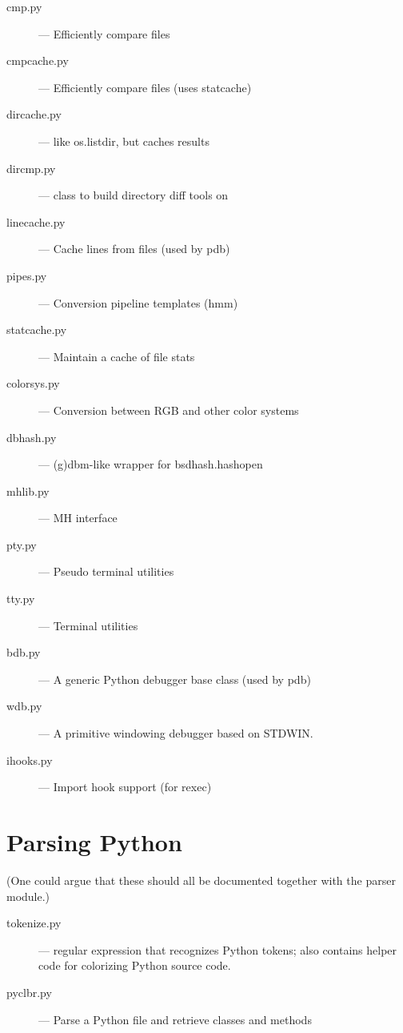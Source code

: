 \begin{description}
\item[cmp.py]
--- Efficiently compare files

\item[cmpcache.py]
--- Efficiently compare files (uses statcache)

\item[dircache.py]
--- like os.listdir, but caches results

\item[dircmp.py]
--- class to build directory diff tools on

\item[linecache.py]
--- Cache lines from files (used by pdb)

\item[pipes.py]
--- Conversion pipeline templates (hmm)

\item[statcache.py]
--- Maintain a cache of file stats

\item[colorsys.py]
--- Conversion between RGB and other color systems

\item[dbhash.py]
--- (g)dbm-like wrapper for bsdhash.hashopen

\item[mhlib.py]
--- MH interface

\item[pty.py]
--- Pseudo terminal utilities

\item[tty.py]
--- Terminal utilities

\item[bdb.py]
--- A generic Python debugger base class (used by pdb)

\item[wdb.py]
--- A primitive windowing debugger based on STDWIN.

\item[ihooks.py]
--- Import hook support (for rexec)
\end{description}


\section{Parsing Python}

(One could argue that these should all be documented together with the
parser module.)

\begin{description}
\item[tokenize.py]
--- regular expression that recognizes Python tokens; also
contains helper code for colorizing Python source code.

\item[pyclbr.py]
--- Parse a Python file and retrieve classes and methods
\end{description}


